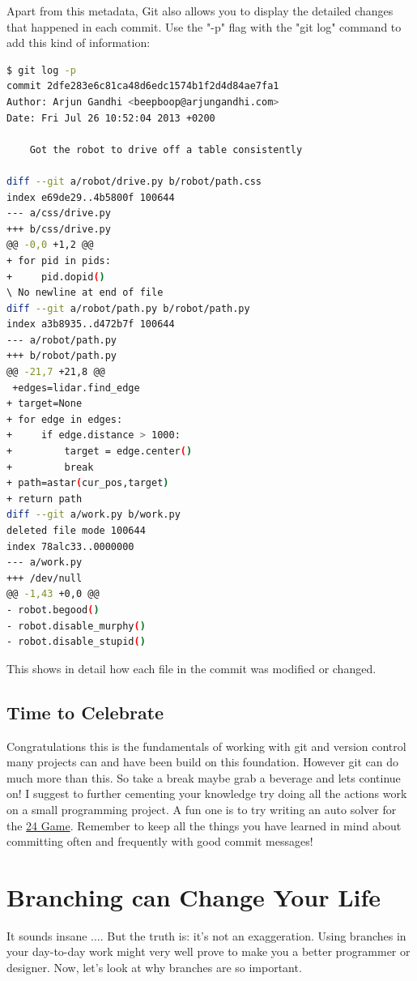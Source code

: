 \documentclass{article}
\begin{document}
Apart from this metadata, Git also allows you to display the detailed changes that happened in each commit. Use the "-p" flag with the "git log" command to add this kind of information:

\begin{lstlisting}[language=bash]
$ git log -p
commit 2dfe283e6c81ca48d6edc1574b1f2d4d84ae7fa1
Author: Arjun Gandhi <beepboop@arjungandhi.com>
Date: Fri Jul 26 10:52:04 2013 +0200

    Got the robot to drive off a table consistently

diff --git a/robot/drive.py b/robot/path.css
index e69de29..4b5800f 100644
--- a/css/drive.py
+++ b/css/drive.py
@@ -0,0 +1,2 @@
+ for pid in pids:
+     pid.dopid()
\ No newline at end of file
diff --git a/robot/path.py b/robot/path.py
index a3b8935..d472b7f 100644
--- a/robot/path.py
+++ b/robot/path.py
@@ -21,7 +21,8 @@
 +edges=lidar.find_edge
+ target=None
+ for edge in edges:
+     if edge.distance > 1000:
+         target = edge.center()
+         break
+ path=astar(cur_pos,target)
+ return path
diff --git a/work.py b/work.py
deleted file mode 100644
index 78alc33..0000000
--- a/work.py
+++ /dev/null
@@ -1,43 +0,0 @@
- robot.begood()
- robot.disable_murphy()
- robot.disable_stupid()
\end{lstlisting}

This shows in detail how each file in the commit was modified or changed. %

\subsection{Time to Celebrate}
Congratulations this is the fundamentals of working with git and version control many projects can and have been build on this foundation. However git can do much more than this. So take a break maybe grab a beverage and lets continue on!
\newline \newline
I suggest to further cementing your knowledge try doing all the actions work on a small programming project. A fun one is to try writing an auto solver for the \href{https://www.24game.com/t-about-howtoplay.aspx}{24 Game}. Remember to keep all the things you have learned in mind about committing often and frequently with good commit messages!

\section{Branching can Change Your Life}
It sounds insane .... But the truth is: it's not an exaggeration. Using branches in your day-to-day work might very well prove to make you a better programmer or designer.
\newline\newline
Now, let's look at why branches are so important.
\end{document}
